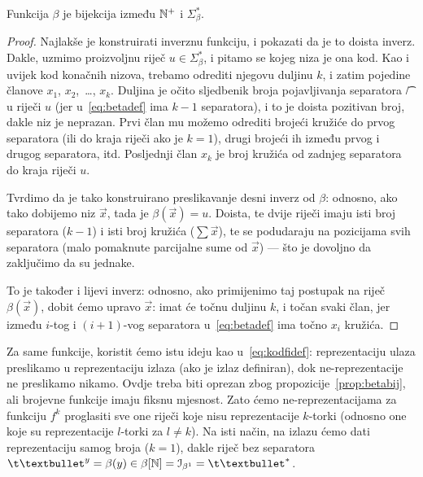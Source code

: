 \begin{propozicija}[{name=[bijektivnost binarne reprezentacije]}]\label{prop:betabij}
Funkcija $\beta$ je bijekcija između ${\mathbb N}^+$ i $\Sigma_\beta^*$.
\end{propozicija}
\begin{proof}
Najlakše je konstruirati inverznu funkciju, i pokazati da je to doista inverz. Dakle, uzmimo proizvoljnu riječ $u\in\Sigma_\beta^*$, i pitamo se kojeg niza je ona kod. Kao i uvijek kod konačnih nizova, trebamo odrediti njegovu duljinu $k$, i zatim pojedine članove $x_1$, $x_2$,~\ldots, $x_k$. Duljina je očito sljedbenik broja pojavljivanja separatora \t/ u riječi $u$ (jer u~\eqref{eq:betadef} ima $k-1$ separatora), i to je doista pozitivan broj, dakle niz je neprazan. Prvi član mu možemo odrediti brojeći kružiće do prvog separatora (ili do kraja riječi ako je $k=1$), drugi brojeći ih između prvog i drugog separatora, itd. Posljednji član $x_k$ je broj kružića od zadnjeg separatora do kraja riječi $u$.

Tvrdimo da je tako konstruirano preslikavanje desni inverz od $\beta$: odnosno, ako tako dobijemo niz $\vec x$, tada je $\beta(\vec x)=u$. Doista, te dvije riječi imaju isti broj separatora ($k-1$) i isti broj kružića ($\sum\vec x$), te se podudaraju na pozicijama svih separatora (malo pomaknute parcijalne sume od $\vec x$) --- što je dovoljno da zaključimo da su jednake.

To je također i lijevi inverz: odnosno, ako primijenimo taj postupak na riječ $\beta(\vec x)$, dobit ćemo upravo $\vec x$: imat će točnu duljinu $k$, i točan svaki član, jer između $i$-tog i $(i+1)$-vog separatora u~\eqref{eq:betadef} ima točno $x_i$ kružića.
\end{proof}

Za same funkcije, koristit ćemo istu ideju kao u~\eqref{eq:kodfidef}: reprezentaciju ulaza preslikamo u reprezentaciju izlaza (ako je izlaz definiran), dok ne-reprezentacije ne preslikamo nikamo. Ovdje treba biti oprezan zbog propozicije~\ref{prop:betabij}, ali brojevne funkcije imaju fiksnu mjesnost. Zato ćemo ne-reprezentacijama za funkciju $f^k$ proglasiti sve one riječi koje nisu reprezentacije $k$-torki (odnosno one koje su reprezentacije $l$-torki za $l\not=k$). Na isti način, na izlazu ćemo dati reprezentaciju samog broja ($k=1$), dakle riječ bez separatora $\t\textbullet^y=\beta(y)\in\beta[\N]=\im{\beta^1}=\t\textbullet^*$.

